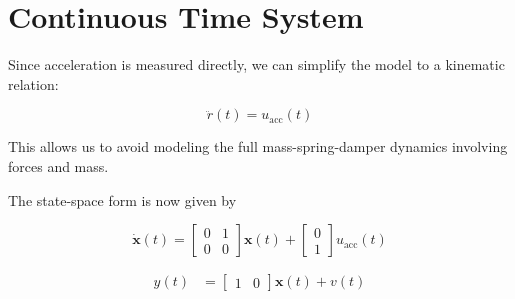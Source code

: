 \section{Continuous Time System}

Since acceleration is measured directly, we can simplify the model 
to a kinematic relation:

\begin{equation}
\ddot{r}(t) = u_{\text{acc}}(t)
\label{eq:kinematics}
\end{equation}

This allows us to avoid modeling the full mass-spring-damper dynamics 
involving forces and mass.

The state-space form is now given by
    
\begin{equation}
    \dot{\mathbf{x}}(t) = 
    \begin{bmatrix}
    0 & 1 \\
    0 & 0
    \end{bmatrix}
    \mathbf{x}(t) +
    \begin{bmatrix}
    0 \\
    1
    \end{bmatrix}
    u_{\text{acc}}(t)
    \label{eq:continuous_system}
\end{equation}

\begin{equation}
    \begin{aligned}
        y(t) &= 
        \begin{bmatrix}
            1 & 0
        \end{bmatrix}
        \mathbf{x}(t) + v(t)
    \end{aligned}
\end{equation}
    